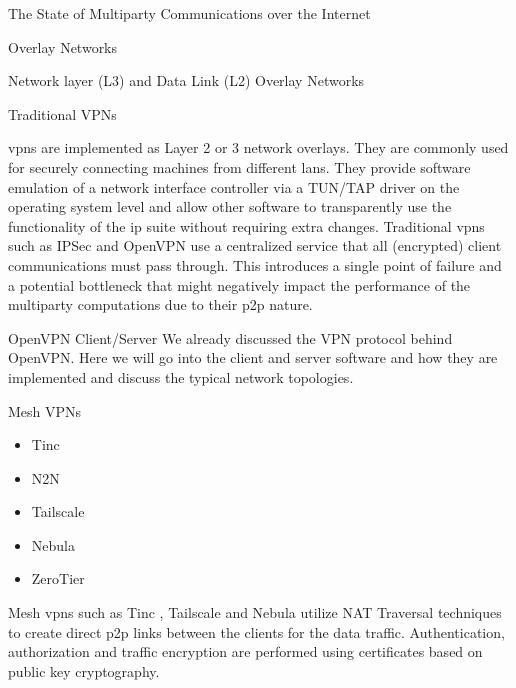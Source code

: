 \begin{frame}[fragile]{The State of Multiparty Communications over the
Internet}
\begin{block}{Overlay Networks}
\begin{block}{Network layer (L3) and Data Link (L2) Overlay Networks}
\begin{block}{Traditional VPNs}
\begin{itemize}
\begin{itemize}
    \glspl{vpn} are implemented as Layer 2 or 3 network overlays. They
    are commonly used for securely connecting machines from different
    \glspl{lan}. They provide software emulation of a network interface
    controller via a TUN/TAP driver on the operating system level and
    allow other software to transparently use the functionality of the
    \gls{ip} suite without requiring extra changes. Traditional
    \glspl{vpn} such as IPSec \autocite{ipSecRFC} and OpenVPN
    \autocite{openVPNDocs} use a centralized service that all
    (encrypted) client communications must pass through. This introduces
    a single point of failure and a potential bottleneck that might
    negatively impact the performance of the multiparty computations due
    to their \gls{p2p} nature.
  \end{itemize}
\end{itemize}

\begin{block}{OpenVPN Client/Server}
\protect\hypertarget{openvpn-clientserver}{}
We already discussed the VPN protocol behind OpenVPN. Here we will go
into the client and server software and how they are implemented and
discuss the typical network topologies.
\end{block}
\end{block}

\begin{block}{Mesh VPNs}
\protect\hypertarget{mesh-vpns}{}
\begin{itemize}
\tightlist
\item
  Tinc
\item
  N2N
\item
  Tailscale
\item
  Nebula
\item
  ZeroTier
\end{itemize}

Mesh \glspl{vpn} such as Tinc \autocite{tincDocs}, Tailscale
\autocite{tailscaleDocs} and Nebula \autocite{nebulaDocs} utilize NAT
Traversal techniques to create direct \gls{p2p} links between the
clients for the data traffic. Authentication, authorization and traffic
encryption are performed using certificates based on public key
cryptography.


\end{block}
\end{block}
\end{block}
\end{frame}
